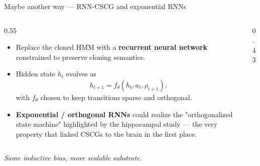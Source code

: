 \documentclass[aspectratio=169,10pt]{beamer}
\begin{document}
\begin{frame}{Maybe another way --- RNN-CSCG and exponential RNNs}
  \begin{columns}[T,onlytextwidth]
    \begin{column}{0.55\textwidth}
      \begin{itemize}\setlength\itemsep{0.4em}
        \item Replace the cloned HMM with a \textbf{recurrent neural network}
              constrained to preserve cloning semantics.
        \item Hidden state $h_t$ evolves as
        \[
          h_{t+1} = f_\theta(h_t, a_t, \rho_{t+1}),
        \]
        with $f_\theta$ chosen to keep transitions sparse and orthogonal.
        \item \textbf{Exponential / orthogonal RNNs} could realize the
              "orthogonalized state machine" highlighted by the hippocampal
              study --- the very property that linked CSCGs to the brain in
              the first place.
      \end{itemize}
    \end{column}
    \begin{column}{0.43\textwidth}
      \centering
    \end{column}
  \end{columns}
  \vspace{0.4em}
  \begin{center}\itshape\color{deepblue}
    Same inductive bias, more scalable substrate.
  \end{center}
\end{frame}
\end{document}
